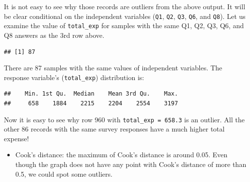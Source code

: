 \documentclass[12pt,]{krantz}
\makeatletter
\newenvironment{Shaded}{\begin{snugshade}}{\end{snugshade}}
\newcommand{\DecValTok}[1]{\textcolor[rgb]{0.06,0.06,0.06}{#1}}
\newcommand{\KeywordTok}[1]{\textcolor[rgb]{0.27,0.27,0.27}{\textbf{#1}}}
\newcommand{\NormalTok}[1]{#1}
\newcommand{\OperatorTok}[1]{\textcolor[rgb]{0.43,0.43,0.43}{\textbf{#1}}}
\newcommand{\StringTok}[1]{\textcolor[rgb]{0.5,0.5,0.5}{#1}}
\providecommand{\tightlist}{%
  \setlength{\itemsep}{0pt}\setlength{\parskip}{0pt}}
\newenvironment{kframe}{%
\medskip{}
\setlength{\fboxsep}{.8em}
 \def\at@end@of@kframe{}%
 \ifinner\ifhmode%
  \def\at@end@of@kframe{\end{minipage}}%
  \begin{minipage}{\columnwidth}%
 \fi\fi%
 \def\FrameCommand##1{\hskip\@totalleftmargin \hskip-\fboxsep
 \colorbox{shadecolor}{##1}\hskip-\fboxsep
     \hskip-\linewidth \hskip-\@totalleftmargin \hskip\columnwidth}%
 \MakeFramed {\advance\hsize-\width
   \@totalleftmargin\z@ \linewidth\hsize
   \@setminipage}}%
 {\par\unskip\endMakeFramed%
 \at@end@of@kframe}
\renewenvironment{Shaded}{\begin{kframe}}{\end{kframe}}
\makeatother
\begin{document}
It is not easy to see why those records are outliers from the above output. It will be clear conditional on the independent variables (\texttt{Q1}, \texttt{Q2}, \texttt{Q3}, \texttt{Q6}, and \texttt{Q8}). Let us examine the value of \texttt{total\_exp} for samples with the same Q1, Q2, Q3, Q6, and Q8 answers as the 3rd row above.

\begin{Shaded}
\end{Shaded}

\begin{verbatim}
## [1] 87
\end{verbatim}

There are 87 samples with the same values of independent variables. The response variable's (\texttt{total\_exp}) distribution is:

\begin{Shaded}
\end{Shaded}

\begin{verbatim}
##    Min. 1st Qu.  Median    Mean 3rd Qu.    Max. 
##     658    1884    2215    2204    2554    3197
\end{verbatim}

Now it is easy to see why row 960 with \texttt{total\_exp\ =\ 658.3} is an outlier. All the other 86 records with the same survey responses have a much higher total expense!

\begin{itemize}
\tightlist
\item
  Cook's distance: the maximum of Cook's distance is around 0.05. Even though the graph does not have any point with Cook's distance of more than 0.5, we could spot some outliers.
\end{itemize}
\end{document}

